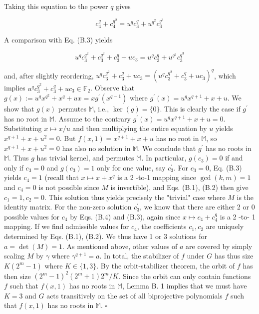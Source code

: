 \documentclass[10pt]{article}
\begin{document}
Taking this equation to the power $q$ gives

$$
c_{4}^{q}+c_{4}^{q^{2}}=u^{q} c_{3}^{q}+u^{q^{2}} c_{3}^{q^{3}}
$$

A comparison with Eq. (B.3) yields

$$
u^{q} c_{3}^{q^{2}}+c_{3}^{q^{2}}+c_{3}^{q}+u c_{3}=u^{q} c_{3}^{q}+u^{q^{2}} c_{3}^{q^{3}}
$$

and, after slightly reordering, $u^{q} c_{3}^{q^{2}}+c_{3}^{q}+u c_{3}=\left(u^{q} c_{3}^{q^{2}}+c_{3}^{q}+u c_{3}\right)^{q}$, which implies $u^{q} c_{3}^{q^{2}}+c_{3}^{q}+ u c_{3} \in \mathbb{F}_{2}$. Observe that $g(x):=u^{q} x^{q^{2}}+x^{q}+u x=x g^{\prime}\left(x^{q-1}\right)$ where $g^{\prime}(x)=u^{q} x^{q+1}+x+u$. We show that $g(x)$ permutes $\mathbb{M}$, i.e., $\operatorname{ker}(g)=\{0\}$. This is clearly the case if $g^{\prime}$ has no root in $\mathbb{M}$. Assume to the contrary $g^{\prime}(x)=u^{q} x^{q+1}+x+u=0$. Substituting $x \mapsto x / u$ and then multiplying the entire equation by $u$ yields $x^{q+1}+x+u^{2}=0$. But $f(x, 1)=x^{q+1}+x+u$ has no root in $\mathbb{M}$, so $x^{q+1}+x+u^{2}=0$ has also no solution in $\mathbb{M}$. We conclude that $g^{\prime}$ has no roots in $\mathbb{M}$. Thus $g$ has trivial kernel, and permutes $\mathbb{M}$. In particular, $g\left(c_{3}\right)=0$ if and only if $c_{3}=0$ and $g\left(c_{3}\right)=1$ only for one value, say $c_{3}^{\prime}$. For $c_{3}=0$, Eq. (B.3) yields $c_{4}=1$ (recall that $x \mapsto x+x^{q}$ is a 2 -to-1 mapping since $\operatorname{gcd}(k, m)=1$ and $c_{4}=0$ is not possible since $M$ is invertible), and Eqs. (B.1), (B.2) then give $c_{1}=1, c_{2}=0$. This solution thus yields precisely the "trivial" case where $M$ is the identity matrix. For the non-zero solution $c_{3}^{\prime}$, we know that there are either 2 or 0 possible values for $c_{4}$ by Eqs. (B.4) and (B.3), again since $x \mapsto c_{4}+c_{4}^{q}$ is a 2 -to- 1 mapping. If we find admissible values for $c_{4}$, the coefficients $c_{1}, c_{2}$ are uniquely determined by Eqs. (B.1), (B.2). We thus have 1 or 3 solutions for $a=\operatorname{det}(M)=1$. As mentioned above, other values of $a$ are covered by simply scaling $M$ by $\gamma$ where $\gamma^{q+1}=a$. In total, the stabilizer of $f$ under $G$ has thus size $K\left(2^{m}-1\right)$ where $K \in\{1,3\}$. By the orbit-stabilizer theorem, the orbit of $f$ has then size $\left(2^{m}-1\right)^{2}\left(2^{m}+1\right) 2^{m} / K$. Since the orbit can only contain functions $f$ such that $f(x, 1)$ has no roots in $\mathbb{M}$, Lemma B. 1 implies that we must have $K=3$ and $G$ acts transitively on the set of all biprojective polynomials $f$ such that $f(x, 1)$ has no roots in $\mathbb{M}$. \(\square\)
\end{document}

